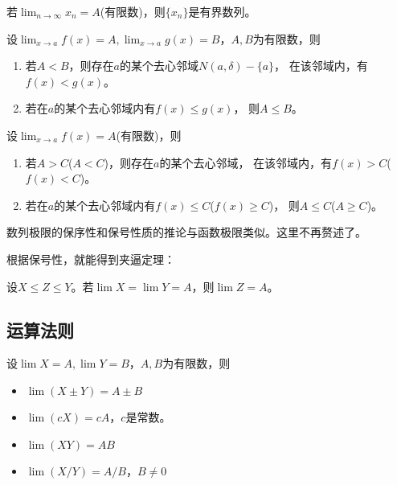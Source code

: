 \begin{theorem}[收敛数列的整体有界性]
  若$\lim_{n\to \infty}x_n=A$(有限数)，则$\{x_n\}$是有界数列。
\end{theorem}

\begin{theorem}[函数极限的保序性]
  设$\lim_{x\to a} f(x)=A,\lim_{x\to a} g(x)=B$，$A,B$为有限数，则
  \begin{enumerate}
    \item
    若$A<B$，则存在$a$的某个去心邻域$N(a,\delta)-\{a\}$，
    在该邻域内，有$f(x) < g(x)$。
    \item
    若在$a$的某个去心邻域内有$f(x) \le g(x)$，
    则$A\le B$。
  \end{enumerate}
\end{theorem}

\begin{corollary}[函数极限的保号性质] \label{thrm:limit-sign-preserve}
  设$\lim_{x\to a} f(x)=A$(有限数)，则
  \begin{enumerate}
    \item
    若$A>C$($A<C$)，则存在$a$的某个去心邻域，
    在该邻域内，有$f(x)>C$($f(x)<C$)。
    \item
    若在$a$的某个去心邻域内有$f(x)\le C$($f(x)\ge C$)，
    则$A\le C$($A\ge C$)。
  \end{enumerate}
\end{corollary}

\begin{remark}
  数列极限的保序性和保号性质的推论与函数极限类似。这里不再赘述了。
\end{remark}

根据保号性，就能得到夹逼定理：
\begin{theorem}[夹逼定理] \label{thrm:squeeze}
  设$X\le Z\le Y$。若$\lim X = \lim Y = A$，则$\lim Z = A$。
\end{theorem}

\subsection{运算法则}
设$\lim X=A,\lim Y=B$，$A,B$为有限数，则
\begin{itemize}
  \item
  $\lim (X\pm Y) = A \pm B$
  \item
  $\lim (cX) = cA$，$c$是常数。
  \item
  $\lim (XY) = AB$
  \item
  $\lim (X/Y) = A/B$，$B\neq 0$
\end{itemize}

